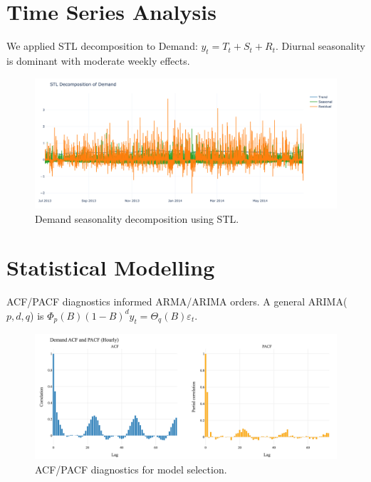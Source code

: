 \documentclass[12pt,a4paper]{article}
\begin{document}
\section{Time Series Analysis}
We applied STL decomposition to Demand: $y_t = T_t + S_t + R_t$. Diurnal seasonality is dominant with moderate weekly effects.

\begin{figure}[H]
  \centering
  \includegraphics[width=\linewidth]{03_demand_seasonality_stl.png}
  \caption{Demand seasonality decomposition using STL.}
  \label{fig:stl}
\end{figure}

\section{Statistical Modelling}
ACF/PACF diagnostics informed ARMA/ARIMA orders. A general ARIMA($p,d,q$) is $\Phi_p(B) (1 - B)^d y_t = \Theta_q(B) \varepsilon_t$.

\begin{figure}[H]
  \centering
  \includegraphics[width=\linewidth]{stats_acf_pacf.png}
  \caption{ACF/PACF diagnostics for model selection.}
  \label{fig:acf_pacf}
\end{figure}
\end{document}
